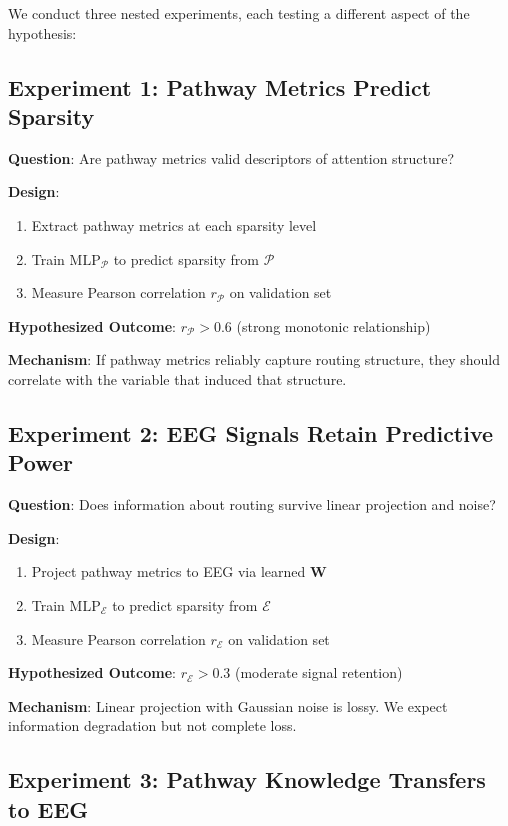 We conduct three nested experiments, each testing a different aspect of the hypothesis:

\subsection{Experiment 1: Pathway Metrics Predict Sparsity}

\textbf{Question}: Are pathway metrics valid descriptors of attention structure?

\textbf{Design}: 
\begin{enumerate}
    \item Extract pathway metrics at each sparsity level
    \item Train $\text{MLP}_{\mathcal{P}}$ to predict sparsity from $\mathcal{P}$
    \item Measure Pearson correlation $r_{\mathcal{P}}$ on validation set
\end{enumerate}

\textbf{Hypothesized Outcome}: $r_{\mathcal{P}} > 0.6$ (strong monotonic relationship)

\textbf{Mechanism}: If pathway metrics reliably capture routing structure, they should correlate with the variable that induced that structure.

\subsection{Experiment 2: EEG Signals Retain Predictive Power}

\textbf{Question}: Does information about routing survive linear projection and noise?

\textbf{Design}:
\begin{enumerate}
    \item Project pathway metrics to EEG via learned $\mathbf{W}$
    \item Train $\text{MLP}_{\mathcal{E}}$ to predict sparsity from $\mathcal{E}$
    \item Measure Pearson correlation $r_{\mathcal{E}}$ on validation set
\end{enumerate}

\textbf{Hypothesized Outcome}: $r_{\mathcal{E}} > 0.3$ (moderate signal retention)

\textbf{Mechanism}: Linear projection with Gaussian noise is lossy. We expect information degradation but not complete loss.

\subsection{Experiment 3: Pathway Knowledge Transfers to EEG}

